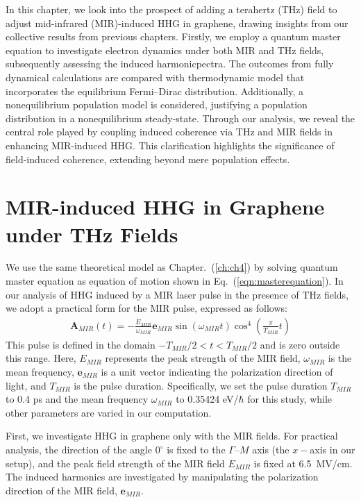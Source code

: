 In this chapter, we look into the prospect of adding a terahertz (THz) field to adjust mid-infrared (MIR)-induced \gls{HHG} in graphene, drawing insights from our collective results from previous chapters. Firstly, we employ a quantum master equation to investigate electron dynamics under both MIR and THz fields, subsequently assessing the induced harmonicpectra. The outcomes from fully dynamical calculations are compared with thermodynamic model that incorporates the equilibrium Fermi--Dirac distribution. Additionally, a nonequilibrium population model is considered, justifying a population distribution in a nonequilibrium steady-state. Through our analysis, we reveal the central role played by coupling induced coherence via THz and MIR fields in enhancing MIR-induced HHG. This clarification highlights the significance of field-induced coherence, extending beyond mere population effects.
\section{MIR-induced HHG in Graphene under THz Fields}
We use the same theoretical model as Chapter.~(\ref{ch:ch4}) by solving quantum master equation as
equation of motion shown in Eq.~(\ref{eqn:masterequation}).
In our analysis of \gls{HHG} induced by a MIR laser pulse in the presence of THz fields, we adopt a practical form for the MIR pulse, expressed as follows:
\begin{align}
	\mathbf A_{MIR}(t) = -\frac{E_{MIR}}{\omega_{MIR}} \mathbf{e}_{MIR}
	\sin(\omega_{MIR} t) \cos^4 \left (\frac{\pi}{T_{MIR}} t \right)
	\label{eqn:laser_pulse}
\end{align}
This pulse is defined in the domain $-T_{MIR}/2<t<T_{MIR}/2$ and is zero outside this range.
Here, $E_{MIR}$ represents the peak strength of the MIR field, $\omega_{MIR}$ is the mean
frequency, $\mathbf e_{MIR}$ is a unit vector indicating the polarization direction of light, and
$T_{MIR}$ is the pulse duration. Specifically, we set the pulse duration $T_{MIR}$ to 0.4 ps and
the mean frequency $\omega_{MIR}$ to 0.35424 eV/$\hbar$ for this study, while other parameters are
varied in our computation.

First, we investigate HHG in graphene only with the MIR fields. For practical analysis, the
direction of the angle $0^\circ$ is fixed to the $\Gamma$--$M$ axis (the $x-$axis in our setup), and the peak field strength of the MIR field $E_{MIR}$ is fixed at 6.5~MV/cm. The induced harmonics are investigated by manipulating the polarization direction of the MIR field, $\mathbf e_{MIR}$.

